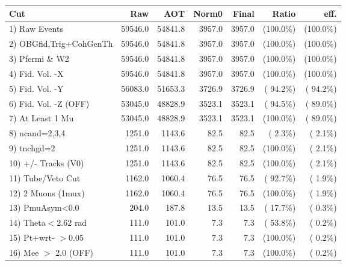  \begin{table}[h!]\centering
 \begin{tabular}{||l||r|r|r|r|r|r||}
 \hline
 \hline
 Cut & Raw & AOT & Norm0 & Final & Ratio & eff.       \\
 \hline
  1) Raw Events           &      59546.0 &      54841.8 &       3957.0 &       3957.0 & (100.0\%) & (100.0\%) \\
  2) OBGfid,Trig+CohGenTh &      59546.0 &      54841.8 &       3957.0 &       3957.0 & (100.0\%) & (100.0\%) \\
  3) Pfermi \& W2         &      59546.0 &      54841.8 &       3957.0 &       3957.0 & (100.0\%) & (100.0\%) \\
  4) Fid. Vol. -X         &      59546.0 &      54841.8 &       3957.0 &       3957.0 & (100.0\%) & (100.0\%) \\
  5) Fid. Vol. -Y         &      56083.0 &      51653.3 &       3726.9 &       3726.9 & ( 94.2\%) & ( 94.2\%) \\
  6) Fid. Vol. -Z (OFF)   &      53045.0 &      48828.9 &       3523.1 &       3523.1 & ( 94.5\%) & ( 89.0\%) \\
  7) At Least 1 Mu        &      53045.0 &      48828.9 &       3523.1 &       3523.1 & (100.0\%) & ( 89.0\%) \\
  8) ncand=2,3,4          &       1251.0 &       1143.6 &         82.5 &         82.5 & (  2.3\%) & (  2.1\%) \\
  9) tnchgd=2             &       1251.0 &       1143.6 &         82.5 &         82.5 & (100.0\%) & (  2.1\%) \\
 10) +/- Tracks (V0)      &       1251.0 &       1143.6 &         82.5 &         82.5 & (100.0\%) & (  2.1\%) \\
 11) Tube/Veto Cut        &       1162.0 &       1060.4 &         76.5 &         76.5 & ( 92.7\%) & (  1.9\%) \\
 12) 2 Muons (1mux)       &       1162.0 &       1060.4 &         76.5 &         76.5 & (100.0\%) & (  1.9\%) \\
 13) PmuAsym<0.0          &        204.0 &        187.8 &         13.5 &         13.5 & ( 17.7\%) & (  0.3\%) \\
 14) Theta$<$2.62 rad     &        111.0 &        101.0 &          7.3 &          7.3 & ( 53.8\%) & (  0.2\%) \\
 15) Pt+wrt- $>$0.05      &        111.0 &        101.0 &          7.3 &          7.3 & (100.0\%) & (  0.2\%) \\
 16) Mee $>$ 2.0  (OFF)   &        111.0 &        101.0 &          7.3 &          7.3 & (100.0\%) & (  0.2\%) \\

\end{tabular}
\end{table}
